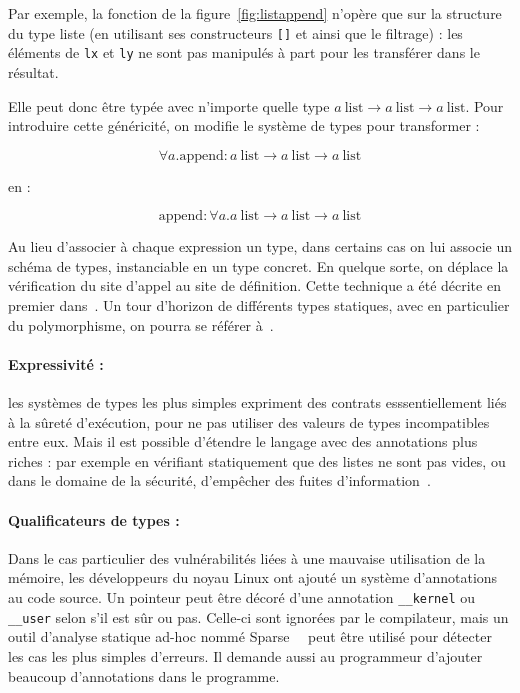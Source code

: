 Par exemple, la fonction de la figure~\ref{fig:listappend} n'opère que sur la
structure du type liste (en utilisant ses constructeurs \texttt{{[}{]}} et
\listcons ainsi que le filtrage) : les éléments de \texttt{lx} et \texttt{ly} ne
sont pas manipulés à part pour les transférer dans le résultat.

Elle peut donc être typée avec n'importe quelle type 
$a~\textrm{list} → a~\textrm{list} → a~\textrm{list}$. Pour introduire cette
généricité, on modifie le système de types pour transformer :

\[ ∀ a. \textrm{append} :
   a~\textrm{list} → a~\textrm{list} → a~\textrm{list}
\]

en :

\[ \textrm{append} : ∀ a.
   a~\textrm{list} → a~\textrm{list} → a~\textrm{list}
\]

Au lieu d'associer à chaque expression un type, dans certains cas on lui associe
un schéma de types, instanciable en un type concret. En quelque sorte, on
déplace la vérification du site d'appel au site de définition. Cette technique a
été décrite en premier dans~\cite{Milner78}.
Un tour d'horizon de différents types statiques, avec en particulier du
polymorphisme, on pourra se référer à~\cite{TAPL}.

\paragraph{Expressivité :} les systèmes de types les plus simples expriment des
contrats esssentiellement liés à la sûreté d'exécution, pour ne pas utiliser des
valeurs de types incompatibles entre eux. Mais il est possible d'étendre le
langage avec des annotations plus riches : par exemple en vérifiant statiquement
que des listes ne sont pas vides\cite{lightweight-static-capabilities}, ou dans
le domaine de la sécurité, d'empêcher des fuites d'information~\cite{LZ06a}.

\paragraph{Qualificateurs de types :} Dans le cas particulier des vulnérabilités
liées à une mauvaise utilisation de la mémoire, les développeurs du noyau Linux
ont ajouté un système d'annotations au code source. Un pointeur peut être décoré
d'une annotation \texttt{\_\_kernel} ou \texttt{\_\_user} selon s'il est sûr ou
pas. Celle-ci sont ignorées par le compilateur, mais un outil d'analyse statique
ad-hoc nommé Sparse~~\cite{TorvaldsSparse} %
peut être utilisé pour détecter les cas les plus simples d'erreurs.
Il demande aussi au programmeur d'ajouter beaucoup d'annotations dans le
programme. %

